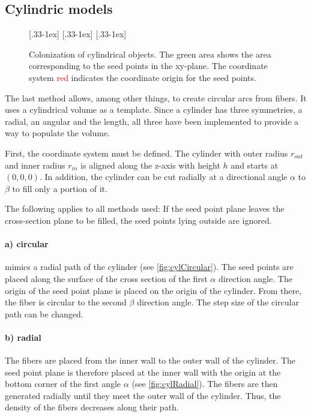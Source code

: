 \subsection{Cylindric models}
%
\begin{figure}[!t]
    \centering
    \setlength{\tikzwidth}{0.31\textwidth}
    [.33\textwidth-1ex]{
    }\hfill
    [.33\textwidth-1ex]{
    }\hfill
    [.33\textwidth-1ex]{
    }
	\caption{Colonization of cylindrical objects. The green area shows the area corresponding to the seed points in the xy-plane. The coordinate system \textcolor{RED}{red} indicates the coordinate origin for the seed points.}
\end{figure}
%
The last method allows, among other things, to create circular arcs from fibers.
It uses a cylindrical volume as a template.
Since a cylinder has three symmetries, a radial, an angular and the length, all three have been implemented to provide a way to populate the volume.
\par
%
First, the coordinate system must be defined.
The cylinder with outer radius $r_{\mathit{out}}$ and inner radius $r_{\mathit{in}}$ is aligned along the z-axis with height $h$ and starts at $(0,0,0)$.
In addition, the cylinder can be cut radially at a directional angle $\alpha$ to $\beta$ to fill only a portion of it.
\par
%
The following applies to all methods used: If the seed point plane leaves the cross-section plane to be filled, the seed points lying outside are ignored.
%
\paragraph{a) circular}
mimics a radial path of the cylinder (see \cref{fig:cylCircular}).
The seed points are placed along the surface of the cross section of the first $\alpha$ direction angle.
The origin of the seed point plane is placed on the origin of the cylinder.
From there, the fiber is circular to the second $\beta$ direction angle.
The step size of the circular path can be changed.
%
\paragraph{b) radial}
The fibers are placed from the inner wall to the outer wall of the cylinder.
The seed point plane is therefore placed at the inner wall with the origin at the bottom corner of the first angle $\alpha$ (see \cref{fig:cylRadial}).
The fibers are then generated radially until they meet the outer wall of the cylinder.
Thus, the density of the fibers decreases along their path.
%

